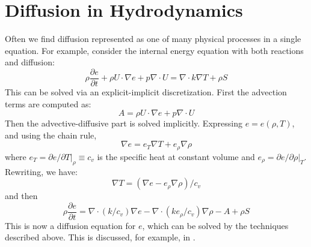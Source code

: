 \section{Diffusion in Hydrodynamics} 

Often we find diffusion represented as one of many physical processes
in a single equation.  For example, consider the internal energy
equation with both reactions and diffusion:
 \begin{equation}
 \rho\frac{\partial e}{\partial t} + \rho U \cdot \nabla e + p \nabla \cdot U = \nabla \cdot k \nabla T + \rho S
 \end{equation}
 This can be solved via an explicit-implicit discretization.  First
 the advection terms are computed as:
 \begin{equation}
 A = \rho U \cdot \nabla e + p \nabla \cdot U
 \end{equation}
 Then the advective-diffusive part is solved implicitly.  Expressing
 $e = e(\rho, T)$, and using the chain rule,
 \begin{equation}
   \nabla e = e_T \nabla T + e_\rho \nabla \rho
 \end{equation}
 where $e_T = \partial e / \partial T |_\rho \equiv c_v$ is the
 specific heat at constant volume and $e_\rho = \partial e / \partial
 \rho |_T$.  Rewriting, we have:
 \begin{equation}
 \nabla T = (\nabla e - e_\rho \nabla \rho)/c_v
 \end{equation}
  and then
 \begin{equation}
 \rho \frac{\partial e}{\partial t} = \nabla \cdot (k/c_v) \nabla e - \nabla \cdot (k e_\rho/c_v) \nabla \rho -A + \rho S
 \end{equation}
 This is now a diffusion equation for $e$, which can be solved by the
 techniques described above.  This is discussed, for example, in
 \cite{SNpaper,malone:2011}.


